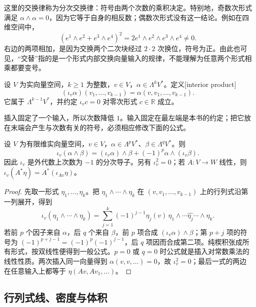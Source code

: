 这里的交换律称为分次交换律：符号由两个次数的乘积决定。特别地，奇数次形式满足 \(\alpha\wedge\alpha=0\)，因为它等于自身的相反数；偶数次形式没有这一结论。例如在四维空间中，
\[
	(e^1\wedge e^2+e^3\wedge e^4)^2
	=2e^1\wedge e^2\wedge e^3\wedge e^4\ne0.
\]
右边的两项相加，是因为交换两个二次块经过 \(2\cdot2\) 次换位，符号为正。由此也可见，“交替”指的是一个形式内部交换向量输入的规律，不能理解为任意两个形式相乘都要变号。

\begin{definition}
	\label{g1:def:interior-product}
	设 \(V\) 为实向量空间，\(k\ge1\) 为整数，\(v\in V\)，\(\alpha\in\Lambda^kV^*\)。定义[interior product]
	\[
		(\iota_v\alpha)(v_1,\ldots,v_{k-1})=\alpha(v,v_1,\ldots,v_{k-1}).
	\]
	它属于 \(\Lambda^{k-1}V^*\)，并约定 \(\iota_v c=0\) 对零次形式 \(c\in\mathbb R\) 成立。
\end{definition}

插入固定了一个输入，所以次数降低 \(1\)。输入固定在最左端是本书的约定；把它放在末端会产生与次数有关的符号，必须相应修改下面的公式。

\begin{proposition}
	\label{g1:prop:interior-product-rule}
	设 \(V\) 为有限维实向量空间，\(v\in V\)，\(\alpha\in\Lambda^pV^*\)、\(\beta\in\Lambda^qV^*\)。则
	\[
		\iota_v(\alpha\wedge\beta)
		=(\iota_v\alpha)\wedge\beta+(-1)^p\alpha\wedge(\iota_v\beta).
	\]
	因此 \(\iota_v\) 是外代数上次数为 \(-1\) 的分次导子。另有 \(\iota_v^2=0\)；若 \(A:V\to W\) 线性，则 \(\iota_v(A^*\eta)=A^*(\iota_{Av}\eta)\)。
\end{proposition}
\begin{proof}
	先取一形式 \(\eta_1,\ldots,\eta_k\)。把 \(\eta_1\wedge\cdots\wedge\eta_k\) 在 \((v,v_1,\ldots,v_{k-1})\) 上的行列式沿第一列展开，得到
	\[
		\iota_v(\eta_1\wedge\cdots\wedge\eta_k)
		=\sum_{j=1}^k(-1)^{j-1}\eta_j(v)
		\,\eta_1\wedge\cdots\widehat{\eta_j}\cdots\wedge\eta_k.
	\]
	若前 \(p\) 个因子来自 \(\alpha\)，后 \(q\) 个来自 \(\beta\)，前 \(p\) 项合成 \((\iota_v\alpha)\wedge\beta\)；第 \(p+j\) 项的符号为 \((-1)^{p+j-1}=(-1)^p(-1)^{j-1}\)，后 \(q\) 项因而合成第二项。纯楔积张成所有形式，按双线性便得到一般公式。\(p=0\) 或 \(q=0\) 时公式就是插入对常数乘法的线性性质。两次插入同一向量得到 \(\alpha(v,v,\ldots)=0\)，故 \(\iota_v^2=0\)；最后一式的两边在任意输入上都等于 \(\eta(Av,Av_1,\ldots)\)。
\end{proof}

\subsection{行列式线、密度与体积}
\label{g1:subsec:1202:04}

